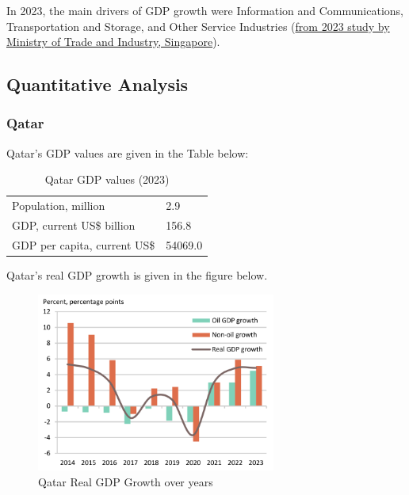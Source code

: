 \documentclass[12pt]{article}
\begin{document}
\noindent In 2023, the main drivers of GDP growth were Information and Communications, Transportation and Storage, and Other Service Industries (\href{https://www.mti.gov.sg/-/media/MTI/Resources/Economic-Survey-of-Singapore/2023/Economic-Survey-of-Singapore-2023/Ch1_AES2023.pdf}{from 2023 study by Ministry of Trade and Industry, Singapore}). 

\subsection*{Quantitative Analysis}

\subsubsection*{Qatar}

Qatar's GDP values are given in the Table below: 

\begin{table}[H]
    \centering
    \begin{tabular}{l l} \hline
        Population, million & 2.9 \\ 
        GDP, current US\$ billion & 156.8 \\ 
        GDP per capita, current US\$ & 54069.0 \\ \hline 
    \end{tabular}
    \caption{Qatar GDP values (2023)}
    \label{5-qatargdp}
\end{table}

\noindent Qatar's real GDP growth is given in the figure below. 

\begin{figure}[H]
    \centering
    \includegraphics[width=0.7\textwidth]{Images/qatargdpgrowth.png}
    \caption{Qatar Real GDP Growth over years}
    \label{fig:5-qatargdp}
\end{figure} 
\end{document}
